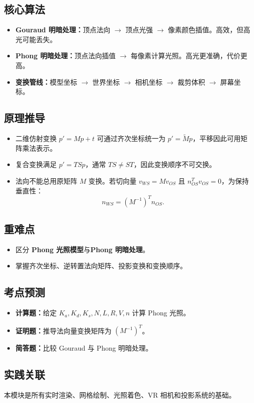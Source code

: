 \documentclass[UTF8,fontset=fandol,11pt]{ctexart}
\newcommand{\key}[1]{\textbf{#1}}
\newcommand{\exam}[1]{\textcolor{blue!55!black}{\textbf{#1}}}
\begin{document}
\subsection{核心算法}
\begin{itemize}
  \item \key{Gouraud 明暗处理：}顶点法向 $\rightarrow$ 顶点光强 $\rightarrow$ 像素颜色插值。高效，但高光可能丢失。
  \item \key{Phong 明暗处理：}顶点法向插值 $\rightarrow$ 每像素计算光照。高光更准确，代价更高。
  \item \key{变换管线：}模型坐标 $\rightarrow$ 世界坐标 $\rightarrow$ 相机坐标 $\rightarrow$ 裁剪体积 $\rightarrow$ 屏幕坐标。
\end{itemize}
\subsection{原理推导}
\begin{itemize}
  \item 二维仿射变换 $p'=Mp+t$ 可通过齐次坐标统一为 $p'=\tilde M p$，平移因此可用矩阵乘法表示。
  \item 复合变换满足 $p'=TSp$，通常 $TS\neq ST$，因此变换顺序不可交换。
  \item 法向不能总用原矩阵 $M$ 变换。若切向量 $v_{WS}=Mv_{OS}$ 且 $n_{OS}^Tv_{OS}=0$，为保持垂直性：
  \[
    n_{WS}=(M^{-1})^Tn_{OS}.
  \]
\end{itemize}
\subsection{重难点}
\begin{itemize}
  \item 区分 \key{Phong 光照模型}与\key{Phong 明暗处理}。
  \item 掌握齐次坐标、逆转置法向矩阵、投影变换和变换顺序。
\end{itemize}
\subsection{考点预测}
\begin{itemize}
  \item \exam{计算题：}给定 $K_a,K_d,K_s,N,L,R,V,n$ 计算 Phong 光照。
  \item \exam{证明题：}推导法向量变换矩阵为 $(M^{-1})^T$。
  \item \exam{简答题：}比较 Gouraud 与 Phong 明暗处理。
\end{itemize}
\subsection{实践关联}
本模块是所有实时渲染、网格绘制、光照着色、VR 相机和投影系统的基础。
\end{document}
